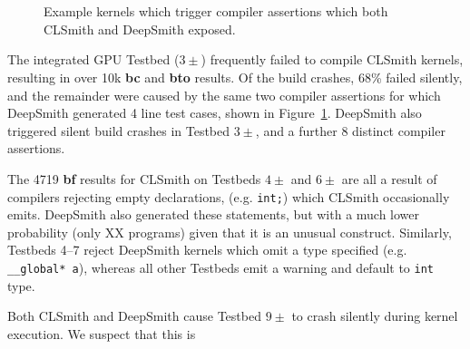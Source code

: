 \begin{figure}
  \centering %
  \\%
  \subfloat[Assertion \emph{iter != pointerOrigMap.end()}.]{%
    \noindent\mbox{\parbox{\columnwidth}{\usebox{\BeigIterAssertion}}}%
    \label{lst:beig-iter-assertion}
  }\\%
  \caption{Example kernels which trigger compiler assertions which both CLSmith and DeepSmith exposed.}%
  \label{lst:beig-assertions}
\end{figure}

The integrated GPU Testbed ($3\pm$) frequently failed to compile CLSmith kernels, resulting in over 10k \textbf{bc} and \textbf{bto} results.
Of the build crashes, 68\% failed silently, and the remainder were caused by the same two compiler assertions for which DeepSmith generated 4 line test cases, shown in Figure~\ref{lst:beig-assertions}. DeepSmith also triggered silent build crashes in Testbed $3\pm$, and a further 8 distinct compiler assertions.

The 4719 \textbf{bf} results for CLSmith on Testbeds $4\pm$ and $6\pm$ are all a result of compilers rejecting empty declarations, (e.g. \texttt{int;}) which CLSmith occasionally emits. DeepSmith also generated these statements, but with a much lower probability (only XX programs) given that it is an unusual construct.
Similarly, Testbeds 4--7 reject DeepSmith kernels which omit a type specified (e.g. \texttt{\_\_global* a}), whereas all other Testbeds emit a warning and default to \texttt{int} type.


 Both CLSmith and DeepSmith cause Testbed $9\pm$ to crash silently during kernel execution. We suspect that this is 

